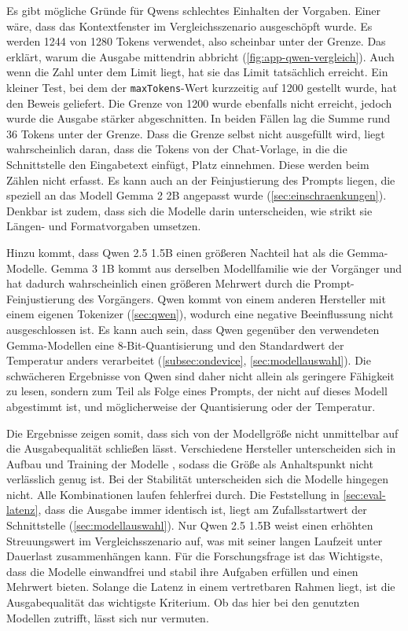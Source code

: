 \noindent Es gibt mögliche Gründe für Qwens schlechtes Einhalten der Vorgaben. Einer wäre, dass das Kontextfenster im Vergleichsszenario ausgeschöpft wurde. Es werden 1244 von 1280 Tokens verwendet, also scheinbar unter der Grenze. Das erklärt, warum die Ausgabe mittendrin abbricht (\autoref{fig:app-qwen-vergleich}). Auch wenn die Zahl unter dem Limit liegt, hat sie das Limit tatsächlich erreicht. Ein kleiner Test, bei dem der \texttt{maxTokens}-Wert kurzzeitig auf 1200 gestellt wurde, hat den Beweis geliefert. Die Grenze von 1200 wurde ebenfalls nicht erreicht, jedoch wurde die Ausgabe stärker abgeschnitten. In beiden Fällen lag die Summe rund 36 Tokens unter der Grenze. Dass die Grenze selbst nicht ausgefüllt wird, liegt wahrscheinlich daran, dass die Tokens von der Chat-Vorlage, in die die Schnittstelle den Eingabetext einfügt, Platz einnehmen. Diese werden beim Zählen nicht erfasst. Es kann auch an der Feinjustierung des Prompts liegen, die speziell an das Modell Gemma 2 2B angepasst wurde (\autoref{sec:einschraenkungen}). Denkbar ist zudem, dass sich die Modelle darin unterscheiden, wie strikt sie Längen- und Formatvorgaben umsetzen.
\vspace{\baselineskip}

\noindent Hinzu kommt, dass Qwen 2.5 1.5B einen größeren Nachteil hat als die Gemma-Modelle. Gemma 3 1B kommt aus derselben Modellfamilie wie der Vorgänger und hat dadurch wahrscheinlich einen größeren Mehrwert durch die Prompt-Feinjustierung des Vorgängers. Qwen kommt von einem anderen Hersteller mit einem eigenen Tokenizer (\autoref{sec:qwen}), wodurch eine negative Beeinflussung nicht ausgeschlossen ist. Es kann auch sein, dass Qwen gegenüber den verwendeten Gemma-Modellen eine 8-Bit-Quantisierung und den Standardwert der Temperatur anders verarbeitet (\autoref{subsec:ondevice}, \autoref{sec:modellauswahl}). Die schwächeren Ergebnisse von Qwen sind daher nicht allein als geringere Fähigkeit zu lesen, sondern zum Teil als Folge eines Prompts, der nicht auf dieses Modell abgestimmt ist, und möglicherweise der Quantisierung oder der Temperatur.
\vspace{\baselineskip}

\noindent Die Ergebnisse zeigen somit, dass sich von der Modellgröße nicht unmittelbar auf die Ausgabequalität schließen lässt. Verschiedene Hersteller unterscheiden sich in Aufbau und Training der Modelle \autocite{gemma2_2024, qwen2025}, sodass die Größe als Anhaltspunkt nicht verlässlich genug ist. Bei der Stabilität unterscheiden sich die Modelle hingegen nicht. Alle Kombinationen laufen fehlerfrei durch. Die Feststellung in \autoref{sec:eval-latenz}, dass die Ausgabe immer identisch ist, liegt am Zufallsstartwert der Schnittstelle (\autoref{sec:modellauswahl}). Nur Qwen 2.5 1.5B weist einen erhöhten Streuungswert im Vergleichsszenario auf, was mit seiner langen Laufzeit unter Dauerlast zusammenhängen kann. Für die Forschungsfrage ist das Wichtigste, dass die Modelle einwandfrei und stabil ihre Aufgaben erfüllen und einen Mehrwert bieten. Solange die Latenz in einem vertretbaren Rahmen liegt, ist die Ausgabequalität das wichtigste Kriterium. Ob das hier bei den genutzten Modellen zutrifft, lässt sich nur vermuten.

